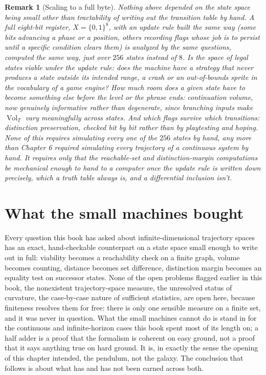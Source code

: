 \documentclass[11pt]{report}
\newtheorem{remark}{Remark}[chapter]
\begin{document}
\begin{remark}[Scaling to a full byte]
Nothing above depended on the state space being small other than
tractability of writing out the transition table by hand. A full
eight-bit register, $X = \{0,1\}^8$, with an update rule built the same
way (some bits advancing a phase or a position, others recording
flags whose job is to persist until a specific condition clears them)
is analyzed by the same questions, computed the same
way, just over $256$ states instead of $8$. Is the space of legal
states viable under the update rule: does the machine have a strategy
that never produces a state outside its intended range, a crash or
an out-of-bounds sprite in the vocabulary of a game engine? How much
room does a given state have to become something else before the level
or the phrase ends: continuation volume, now genuinely informative
rather than degenerate, since branching inputs make $\operatorname{Vol}_T$
vary meaningfully across states. And which flags survive which
transitions: distinction preservation, checked bit by bit rather than
by playtesting and hoping. None of this requires simulating every one
of the $256$ states by hand, any more than Chapter 6 required
simulating every trajectory of a continuous system by hand. It requires
only that the reachable-set and distinction-margin computations be
mechanical enough to hand to a computer once the update rule is
written down precisely, which a truth table always is, and a
differential inclusion isn't.
\end{remark}

\section*{What the small machines bought}

Every question this book has asked about infinite-dimensional
trajectory spaces has an exact, hand-checkable counterpart on a state
space small enough to write out in full: viability becomes a
reachability check on a finite graph, volume becomes counting, distance
becomes set difference, distinction margin becomes an equality test on
successor states. None of the open problems flagged earlier in this
book, the nonexistent trajectory-space measure, the unresolved status
of curvature, the case-by-case nature of sufficient statistics, are
open here, because finiteness resolves them for free: there is only
one sensible measure on a finite set, and it was never in question.
What the small machines cannot do is stand in for the continuous and
infinite-horizon cases this book spent most of its length on; a half
adder is a proof that the formalism is coherent on easy ground, not a
proof that it says anything true on hard ground. It is, in exactly the
sense the opening of this chapter intended, the pendulum, not the
galaxy. The conclusion that follows is about what has and has not been
earned across both.
\end{document}
